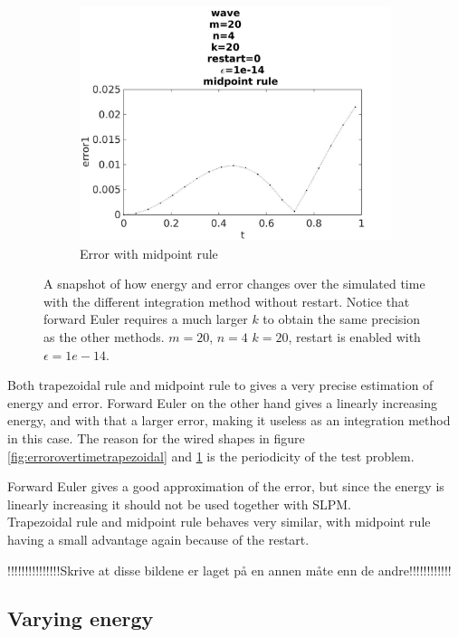 \begin{figure}[H]
\begin{subfigure}[b]{0.30\textwidth}
                \includegraphics[width=\textwidth]{../MATLAB/fig/errorovertimemidpoint.jpg}
                \caption{ Error with midpoint rule }
                \label{fig:errorovertimemidpoint}
        \end{subfigure}
        \caption{A snapshot of how energy and error changes over the simulated time with the different integration method without restart. Notice that forward Euler requires a much larger $k$ to obtain the same precision as the other methods. $m = 20$, $n = 4$ $k=20$, restart is enabled with $\epsilon = 1e-14$.}
        \label{fig:error}
\end{figure}
Both trapezoidal rule and midpoint rule to gives a very precise estimation of energy and error. Forward Euler on the other hand gives a linearly increasing energy, and with that a larger error, making it useless as an integration method in this case. The reason for the wired shapes in figure \ref{fig:errorovertimetrapezoidal} and \ref{fig:errorovertimemidpoint} is the periodicity of the test problem. 

Forward Euler gives a good approximation of the error, but since the energy is linearly increasing it should not be used together with SLPM. \\

Trapezoidal rule and midpoint rule behaves very similar, with midpoint rule having a small advantage again because of the restart.

!!!!!!!!!!!!!!!Skrive at disse bildene er laget på en annen måte enn de andre!!!!!!!!!!!!\\
\subsection{Varying energy}%

